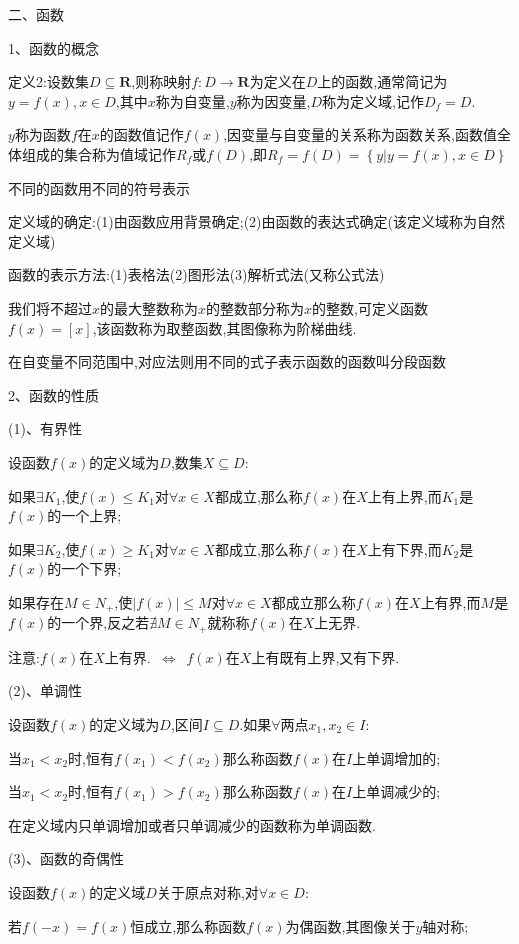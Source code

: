 \documentclass[UTF8]{ctexart}
\begin{document}
二、函数

1、函数的概念

定义2:设数集$D\subseteq  \mathbf{R} $,则称映射$f:D\to  \mathbf{R} $为定义在$D$上的函数,通常简记为$y=f(x),x\in D$,其中$x$称为自变量,$y$称为因变量,$D$称为定义域,记作$D_f=D$.

$y$称为函数$f$在$x$的函数值记作$f(x)$,因变量与自变量的关系称为函数关系,函数值全体组成的集合称为值域记作$R_f$或$f(D)$,即$R_f=f(D)=\left\{  y|y=f(x),x\in D \right\}$

不同的函数用不同的符号表示

定义域的确定:(1)由函数应用背景确定;(2)由函数的表达式确定(该定义域称为自然定义域)

函数的表示方法:(1)表格法(2)图形法(3)解析式法(又称公式法)

我们将不超过$x$的最大整数称为$x$的整数部分称为$x$的整数,可定义函数$f(x)=[x]$,该函数称为取整函数,其图像称为阶梯曲线.

在自变量不同范围中,对应法则用不同的式子表示函数的函数叫分段函数

2、函数的性质

(1)、有界性

设函数$f(x)$的定义域为$D$,数集$X\subseteq D$:

如果$\exists K_{1}$,使$f(x)\leqslant K_{1}$对$\forall x\in X$都成立,那么称$f(x)$在$X$上有上界,而$K_{1}$是$f(x)$的一个上界;

如果$\exists K_{2}$,使$f(x)\geqslant  K_{1}$对$\forall x\in X$都成立,那么称$f(x)$在$X$上有下界,而$K_{2}$是$f(x)$的一个下界;

如果存在$M\in N_{+}$,使$|f(x)|\leqslant M$对$\forall x\in X$都成立那么称$f(x)$在$X$上有界,而$M$是$f(x)$的一个界,反之若$\nexists M\in N_{+}$就称称$f(x)$在$X$上无界.

注意:$f(x)$在$X$上有界.\ $\Longleftrightarrow $\ $f(x)$在$X$上有既有上界,又有下界.

(2)、单调性

设函数$f(x)$的定义域为$D$,区间$I\subseteq D$.如果$\forall $两点$x_{1},x_{2}\in I$:

当$x_{1}<x_{2}$时,恒有$f(x_{1})<f(x_{2})$那么称函数$f(x)$在$I$上单调增加的;

当$x_{1}<x_{2}$时,恒有$f(x_{1})>f(x_{2})$那么称函数$f(x)$在$I$上单调减少的;

在定义域内只单调增加或者只单调减少的函数称为单调函数.

(3)、函数的奇偶性

设函数$f(x)$的定义域$D$关于原点对称,对$\forall x\in D$:

若$f(-x)=f(x)$恒成立,那么称函数$f(x)$为偶函数,其图像关于$y$轴对称;
\end{document}

